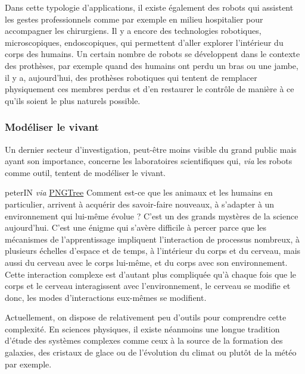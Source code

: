 Dans cette typologie d'applications, il existe également des robots qui assistent les gestes professionnels comme par exemple en milieu hospitalier pour accompagner les chirurgiens. Il y a encore des technologies robotiques, microscopiques, endoscopiques, qui permettent d'aller explorer l'intérieur du corps des humains. Un certain nombre de robots se développent dans le contexte des prothèses, par exemple quand des humains ont perdu un bras ou une jambe, il y a, aujourd'hui, des prothèses robotiques qui tentent de remplacer physiquement ces membres perdus et d'en restaurer le contrôle de manière à ce qu'ils soient le plus naturels possible. 

\subsubsection[Modéliser le vivant]{Modéliser le vivant}
\label{subsub:III.2.2.3}

Un dernier secteur d'investigation, peut-être moins visible du grand public mais ayant son importance, concerne les laboratoires scientifiques qui, \textit{via} les robots comme outil, tentent de modéliser le vivant.

%
{peterIN \textit{via} \href{https://fr.pngtree.com/freepng/tech-robot_1780420.html}{PNGTree}}
Comment est-ce que les animaux et les humains en particulier, arrivent à acquérir des savoir-faire nouveaux, à s'adapter à un environnement qui lui-même évolue ? C'est un des grands mystères de la science aujourd'hui. C'est une énigme qui s'avère difficile à percer parce que les mécanismes de l'apprentissage impliquent l'interaction de processus nombreux, à plusieurs échelles d'espace et de temps, à l'intérieur du corps et du cerveau, mais aussi du cerveau avec le corps lui-même, et du corps avec son environnement. Cette interaction complexe est d'autant plus compliquée qu'à chaque fois que le corps et le cerveau interagissent avec l'environnement, le cerveau se modifie et donc, les modes d'interactions eux-mêmes se modifient. 

Actuellement, on dispose de relativement peu d'outils pour comprendre cette complexité. En sciences physiques, il existe néanmoins une longue tradition d'étude des systèmes complexes comme ceux à la source de la formation des galaxies, des cristaux de glace ou de l'évolution du climat ou plutôt de la météo par exemple. 

